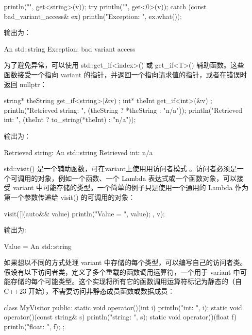 \begin{cpp}
println("{}", get<string>(v));
try {
    println("{}", get<0>(v));
} catch (const bad_variant_access& ex) {
    println("Exception: {}", ex.what());
}
\end{cpp}

输出为：

\begin{shell}
An std::string
Exception: bad variant access
\end{shell}

为了避免异常，可以使用 std::get\_if<index>() 或 get\_if<T>() 辅助函数。这些函数接受一个指向 variant 的指针，并返回一个指向请求值的指针，或者在错误时返回 nullptr：

\begin{cpp}
string* theString { get_if<string>(&v) };
int* theInt { get_if<int>(&v) };
println("Retrieved string: {}", (theString ? *theString : "n/a"));
println("Retrieved int: {}", (theInt ? to_string(*theInt) : "n/a"));
\end{cpp}

输出为：

\begin{shell}
Retrieved string: An std::string
Retrieved int: n/a
\end{shell}

std::visit() 是一个辅助函数，可在variant上使用用访问者模式 。访问者必须是一个可调用的对象，例如一个函数、一个 Lambda 表达式或一个函数对象，可以接受 variant 中可能存储的类型。一个简单的例子只是使用一个通用的 Lambda 作为第一个参数传递给 visit() 的可调用的对象：

\begin{cpp}
visit([](auto&& value) { println("Value = {}", value); }, v);
\end{cpp}

输出为:

\begin{shell}
Value = An std::string
\end{shell}

如果想以不同的方式处理 variant 中存储的每个类型，可以编写自己的访问者类。假设有以下访问者类，定义了多个重载的函数调用运算符，一个用于 variant 中可能存储的每个可能类型。这个实现将所有它的函数调用运算符标记为静态的（自 C++23 开始），不需要访问非静态成员函数或数据成员：

\begin{cpp}
class MyVisitor
{
    public:
        static void operator()(int i) { println("int: {}", i); }
        static void operator()(const string& s) { println("string: {}", s); }
        static void operator()(float f) { println("float: {}", f); }
};
\end{cpp}

